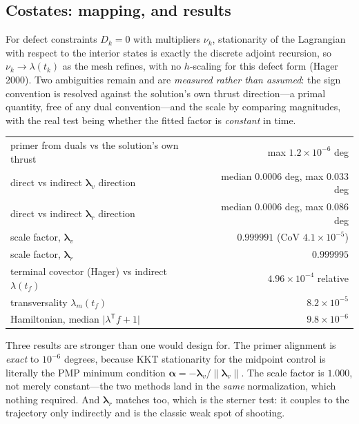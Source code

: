 \documentclass[11pt]{article}
\newcommand{\bal}{\boldsymbol{\alpha}}
\begin{document}
\subsection{Costates: mapping, and results}

For defect constraints $D_k = 0$ with multipliers $\nu_k$, stationarity of the
Lagrangian with respect to the interior states is exactly the discrete adjoint
recursion, so $\nu_k \to \lambda(t_k)$ as the mesh refines, with no $h$-scaling
for this defect form (Hager 2000). Two ambiguities remain and are
\emph{measured rather than assumed}: the sign convention is resolved against the
solution's own thrust direction---a primal quantity, free of any dual
convention---and the scale by comparing magnitudes, with the real test being
whether the fitted factor is \emph{constant} in time.

\begin{table}[h]
\centering\small
\begin{tabular}{lr}
\toprule
primer from duals vs the solution's own thrust & max $1.2\times10^{-6}$ deg \\
direct vs indirect $\boldsymbol{\lambda}_v$ direction & median $0.0006$ deg, max $0.033$ deg \\
direct vs indirect $\boldsymbol{\lambda}_r$ direction & median $0.0006$ deg, max $0.086$ deg \\
scale factor, $\boldsymbol{\lambda}_v$ & $0.999991$ (CoV $4.1\times10^{-5}$) \\
scale factor, $\boldsymbol{\lambda}_r$ & $0.999995$ \\
terminal covector (Hager) vs indirect $\lambda(t_f)$ & $4.96\times10^{-4}$ relative \\
transversality $\lambda_m(t_f)$ & $8.2\times10^{-5}$ \\
Hamiltonian, median $\lvert\lambda^{\mathsf T}f + 1\rvert$ & $9.8\times10^{-6}$ \\
\bottomrule
\end{tabular}
\end{table}

Three results are stronger than one would design for. The primer alignment is
\emph{exact} to $10^{-6}$ degrees, because KKT stationarity for the midpoint
control is literally the PMP minimum condition
$\bal = -\boldsymbol{\lambda}_v/\lVert\boldsymbol{\lambda}_v\rVert$. The scale
factor is $1.000$, not merely constant---the two methods land in the \emph{same}
normalization, which nothing required. And $\boldsymbol{\lambda}_r$ matches too,
which is the sterner test: it couples to the trajectory only indirectly and is
the classic weak spot of shooting.
\end{document}
